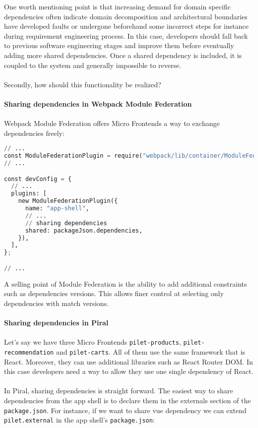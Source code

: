 \documentclass[a4paper]{book}
\begin{document}
One worth mentioning point is that increasing demand for domain specific dependencies often indicate domain decomposition and architectural boundaries have developed faults or undergone beforehand some incorrect steps for instance during requirement engineering process. In this case, developers should fall back to previous software engineering stages and improve them before eventually adding more shared dependencies. Once a shared dependency is included, it is coupled to the system and generally impossible to reverse.
\\ \\ 
Secondly, how should this functionality be realized? 
\\ \\ 
\textbf{
Sharing dependencies in Webpack Module Federation
}
\\ \\ 
Webpack Module Federation offers Micro Frontends a way to exchange dependencies freely:
\begin{lstlisting}[language=Python]
// ...
const ModuleFederationPlugin = require("webpack/lib/container/ModuleFederationPlugin");
// ...

const devConfig = {
  // ...
  plugins: [
    new ModuleFederationPlugin({
      name: "app-shell",
      // ...
      // sharing dependencies
      shared: packageJson.dependencies,
    }),
  ],
};

// ...
\end{lstlisting}
A selling point of Module Federation is the ability to add additional constraints such as dependencies versions. This allows finer control at selecting only dependencies with match versions.
\\ \\
\textbf{
Sharing dependencies in Piral
}
\\ \\ 
Let’s say we have three Micro Frontends \verb|pilet-products|, \verb|pilet-recommendation| and \verb|pilet-carts|. All of them use the same framework that is React. Moreover, they can use additional libraries such as React Router DOM. In this case developers need a way to allow they use one single dependency of React.
\\ \\ 
In Piral, sharing dependencies is straight forward. The easiest way to share dependencies from the app shell is to declare them in the externals section of the \verb|package.json|. For instance, if we want to share vue dependency we can extend \verb|pilet.external| in the app shell's \verb|package.json|:
\end{document}
